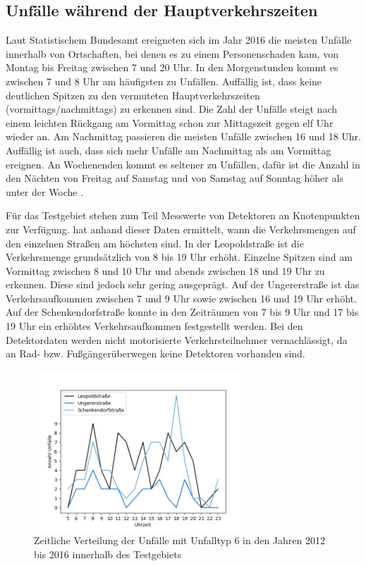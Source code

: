\subsection{Unfälle während der Hauptverkehrszeiten}\label{subsechtion:Unfälle während der HVZ}
Laut Statistischem Bundesamt ereigneten sich im Jahr 2016 die meisten Unfälle innerhalb von Ortschaften, bei denen es zu einem Personenschaden kam, von Montag bis Freitag zwischen 7 und 20 Uhr. In den Morgenstunden kommt es zwischen 7 und 8 Uhr am häufigsten zu Unfällen. Auffällig ist, dass keine deutlichen Spitzen zu den vermuteten Hauptverkehrszeiten (vormittags/nachmittags) zu erkennen sind.  Die Zahl der Unfälle steigt nach einem leichten Rückgang am Vormittag schon zur Mittagszeit gegen elf Uhr wieder an. Am Nachmittag passieren die meisten Unfälle zwischen 16 und 18 Uhr. Auffällig ist auch, dass sich mehr Unfälle am Nachmittag als am Vormittag ereignen. An Wochenenden kommt es seltener zu Unfällen, dafür ist die Anzahl in den Nächten von Freitag auf Samstag und von Samstag auf Sonntag höher als unter der Woche \parencite[S. 80f]{StatistischesBundesamt.2017}.

Für das Testgebiet stehen zum Teil Messwerte von Detektoren an Knotenpunkten zur Verfügung. \Textcite[S. 10-16]{Bruhn.2018} hat anhand dieser Daten ermittelt, wann die Verkehrsmengen auf den einzelnen Straßen am höchsten sind. In der Leopoldstraße ist die Verkehrsmenge grundsätzlich von 8 bis 19 Uhr erhöht. Einzelne Spitzen sind am Vormittag zwischen 8 und 10 Uhr und abends zwischen 18 und 19 Uhr zu erkennen. Diese sind jedoch sehr gering ausgeprägt. Auf der Ungererstraße ist das Verkehrsaufkommen zwischen 7 und 9 Uhr sowie zwischen 16 und 19 Uhr erhöht. Auf der Schenkendorfstraße konnte in den Zeiträumen von 7 bis 9 Uhr und 17 bis 19 Uhr ein erhöhtes Verkehrsaufkommen festgestellt werden. Bei den Detektordaten werden nicht motorisierte Verkehrsteilnehmer vernachlässigt, da an Rad- bzw. Fußgängerüberwegen keine Detektoren vorhanden sind.

\begin{savenotes}
	\begin{figure}[H]
		\centering
		\includegraphics[width=8cm,height=6cm]{figures/Typ6}
		\caption[Zeitliche Verteilung der Unfälle mit Unfalltyp 6 in den Jahren 2012 bis 2016 innerhalb des Testgebiets]{Zeitliche Verteilung der Unfälle mit Unfalltyp 6 in den Jahren 2012 bis 2016 innerhalb des Testgebiets}\label{fig:Unfalltyp6_Uhrzeit}
	\end{figure}
\end{savenotes}

